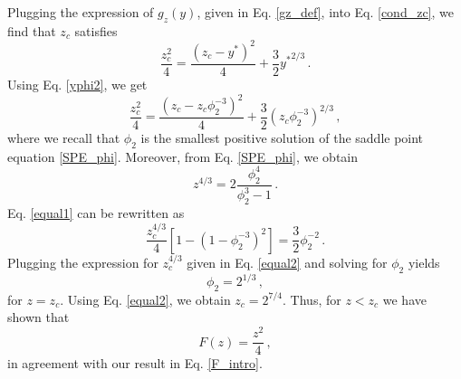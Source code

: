 \documentclass[aps,pre,twocolumn,superscriptaddress,showpacs]{revtex4-1}
\begin{document}
Plugging the expression of $g_z(y)$, given in Eq. \eqref{gz_def}, into Eq. \eqref{cond_zc}, we find that $z_c$ satisfies
\begin{equation}
\frac{z_c^2}{4}=\frac{(z_c-y^*)^2}{4}+\frac{3}{2}{y^*}^{2/3}\,.
\end{equation}
Using Eq. \eqref{yphi2}, we get
\begin{equation}
\frac{z_c^2}{4}=\frac{(z_c-z_c\phi_2^{-3})^2}{4}+\frac{3}{2}\left(z_c\phi_2^{-3}\right)^{2/3}\,,
\label{equal1}
\end{equation}
where we recall that $\phi_2$ is the smallest positive solution of the saddle point equation \eqref{SPE_phi}. Moreover, from Eq. \eqref{SPE_phi}, we obtain
\begin{equation}
z^{4/3}=2\frac{\phi_2^4}{\phi_2^3-1}\,.
\label{equal2}
\end{equation}
Eq. \eqref{equal1} can be rewritten as
\begin{equation}
\frac{z_c^{4/3}}{4}\left[1-(1-\phi_2^{-3})^2\right]=\frac32 \phi_2^{-2}\,.
\end{equation}
Plugging the expression for $z_c^{4/3}$ given in Eq. \eqref{equal2} and solving for $\phi_2$ yields
\begin{equation}
\phi_2=2^{1/3}\,,
\end{equation}
for $z=z_c$. Using Eq. \eqref{equal2}, we obtain $z_c=2^{7/4}$. Thus, for $z<z_c$ we have shown that
\begin{equation}
F(z)=\frac{z^2}{4}\,,
\end{equation}
in agreement with our result in Eq. \eqref{F_intro}.
\end{document}
